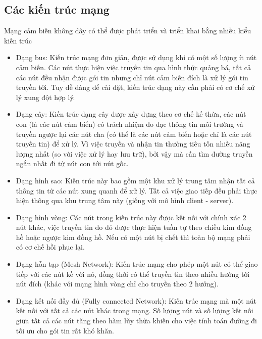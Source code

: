 \subsection{Các kiến trúc mạng}
Mạng cảm biến không dây có thể được phát triển và triển khai bằng nhiều kiểu kiến trúc \cite{wsn_topology}
\begin{itemize}
\item Dạng bus: Kiến trúc mạng đơn giản, được sử dụng khi có một số lượng ít nút cảm biến. Các nút thực hiện việc truyền tin qua hình thức quảng bá, tất cả các nút đều nhận được gói tin nhưng chỉ nút cảm biến đích là xử lý gói tin truyền tới. Tuy dễ dàng để cài đặt, kiến trúc dạng này cần phải có cơ chế xử lý xung đột hợp lý.
\item Dạng cây: Kiến trúc dạng cây được xây dựng theo cơ chế kế thừa, các nút con (là các nút cảm biến) có trách nhiệm đo đạc thông tin môi trường và truyền ngược lại các nút cha (có thể là các nút cảm biến hoặc chỉ là các nút truyền tin) để xử lý. Vì việc truyền và nhận tin thường tiêu tốn nhiều năng lượng nhất (so với việc xử lý hay lưu trữ), bởi vậy mà cần tìm đường truyền ngắn nhất đi từ nút con tới nút gốc.
\item Dạng hình sao: Kiến trúc này bao gồm một khu xử lý trung tâm nhận tất cả thông tin từ các nút xung quanh để xử lý. Tất cả việc giao tiếp đều phải thực hiện thông qua khu trung tâm này (giống với mô hình client - server). 
\item Dạng hình vòng: Các nút trong kiến trúc này được kết nối với chính xác 2 nút khác, việc truyền tin do đó được thực hiện tuần tự theo chiều kim đồng hồ hoặc ngược kim đồng hồ. Nếu có một nút bị chết thì toàn bộ mạng phải có cơ chế hồi phục lại.
\item Dạng hỗn tạp (Mesh Network): Kiến trúc mạng cho phép một nút có thể giao tiếp với các nút kề với nó, đồng thời có thể truyền tin theo nhiều hướng tới nút đích (khác với mạng hình vòng chỉ cho truyền theo 2 hướng).
\item Dạng kết nối đầy đủ (Fully connected Network): Kiến trúc mạng mà một nút kết nối với tất cả các nút khác trong mạng. Số lượng nút và số lượng kết nối giữa tất cả các nút tăng theo hàm lũy thừa khiến cho việc tính toán đường đi tối ưu cho gói tin rất khó khăn.
\end{itemize}
 
